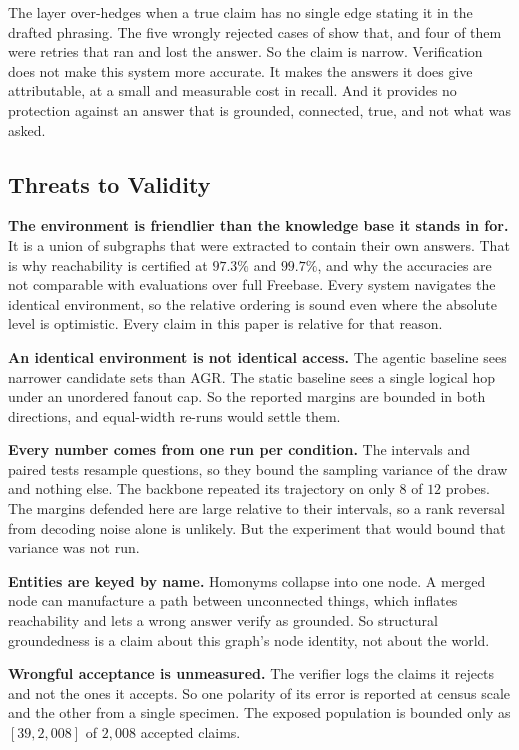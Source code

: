 The layer over-hedges when a true claim has no single edge stating it in the
drafted phrasing. The five wrongly rejected cases of  show
that, and four of them were retries that ran and lost the answer. So the claim
is narrow. Verification does not make this system more accurate. It makes the
answers it does give attributable, at a small and measurable cost in recall. And
it provides no protection against an answer that is grounded, connected, true,
and not what was asked.

\subsection{Threats to Validity}\label{sec:threats}

\textbf{The environment is friendlier than the knowledge base it stands in for.}
It is a union of subgraphs that were extracted to contain their own answers.
That is why reachability is certified at $97.3\%$ and $99.7\%$, and why the
accuracies are not comparable with evaluations over full Freebase. Every system
navigates the identical environment, so the relative ordering is sound even
where the absolute level is optimistic. Every claim in this paper is relative
for that reason.

\textbf{An identical environment is not identical access.} The agentic baseline
sees narrower candidate sets than AGR. The static baseline sees a single logical
hop under an unordered fanout cap. So the reported margins are bounded in both
directions, and equal-width re-runs would settle them.

\textbf{Every number comes from one run per condition.} The intervals and paired
tests resample questions, so they bound the sampling variance of the draw and
nothing else. The backbone repeated its trajectory on only $8$ of $12$ probes.
The margins defended here are large relative to their intervals, so a rank
reversal from decoding noise alone is unlikely. But the experiment that would
bound that variance was not run.

\textbf{Entities are keyed by name.} Homonyms collapse into one node. A merged
node can manufacture a path between unconnected things, which inflates
reachability and lets a wrong answer verify as grounded. So structural
groundedness is a claim about this graph's node identity, not about the world.

\textbf{Wrongful acceptance is unmeasured.} The verifier logs the claims it
rejects and not the ones it accepts. So one polarity of its error is reported at
census scale and the other from a single specimen. The exposed population is
bounded only as $[39, 2{,}008]$ of $2{,}008$ accepted claims.

